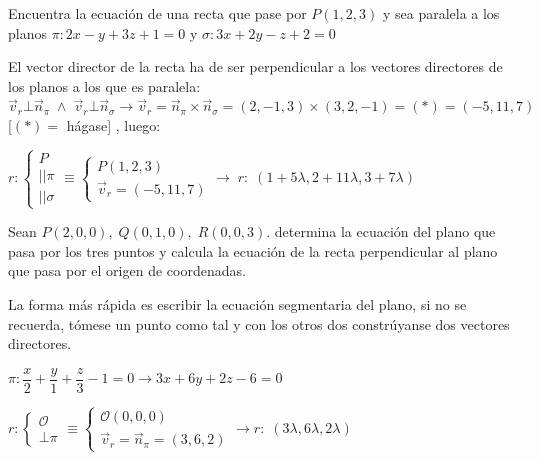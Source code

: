 \begin{ejre}
	Encuentra la ecuación de una recta que pase por $P(1,2,3)$ y sea paralela a los planos $\pi: 2x-y+3z+1=0$ y $\sigma: 3x+2y-z+2=0$
\end{ejre}

\begin{proofw}\renewcommand{\qedsymbol}{$\diamond$}
	El vector director de la recta ha de ser perpendicular a los vectores directores de los planos a los que es paralela: $\vec v_r \bot \vec n_{\pi} \; \wedge \; \vec v_r \bot \vec n_{\sigma} \to \vec v_r=\vec n_{\pi} \times \vec n_{\sigma}=(2,-1,3)\times(3,2,-1)=(*)=(-5,11,7)$ \footnotesize{\textcolor{gris}{[$(*)=$ hágase]}} \normalsize{, luego:}
	
	\noindent $r:\begin{cases} P \\ ||\pi \\ ||\sigma \end{cases} \equiv \begin{cases} P(1,2,3) \\ \vec v_r=(-5,11,7) \end{cases} \to \; r:\;(1+5\lambda, 2+11\lambda, 3+7\lambda)$  
\end{proofw}


\begin{ejre}
	Sean $P(2,0,0),\; Q(0,1,0),\; R(0,0,3)$. determina la ecuación del plano que pasa por los tres puntos y calcula la ecuación de la recta perpendicular al plano que pasa por el origen de coordenadas.
\end{ejre}

\begin{proofw}\renewcommand{\qedsymbol}{$\diamond$}
	La forma más rápida es escribir la ecuación segmentaria del plano, si no se recuerda, tómese un punto como tal y con los otros dos constrúyanse dos vectores directores.

\noindent $\pi: \dfrac x 2 + \dfrac y 1 + \dfrac z 3 -1 =0 \to 3x+6y+2z-6=0$

\noindent $r:\begin{cases} \mathcal O \\ \bot \pi \end{cases} \equiv	 \begin{cases} \mathcal O(0,0,0) \\ \vec v_r=\vec n_{\pi}=(3,6,2) \end{cases} \to r:\; (3\lambda, 6\lambda,2\lambda)$
	
\end{proofw}


